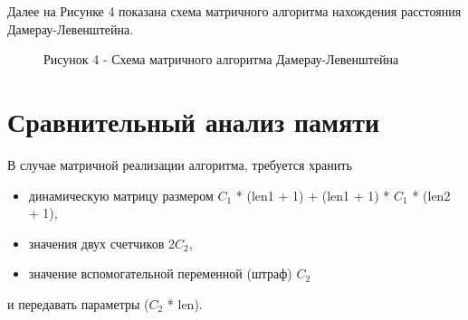 \documentclass[12pt]{report}
\begin{document}
\newpage
Далее на Рисунке 4 показана схема матричного алгоритма нахождения расстояния Дамерау-Левенштейна.
\begin{figure}[h!]
	\caption*{Рисунок 4 - Схема матричного алгоритма Дамерау-Левенштейна}
\end{figure}

\section{Сравнительный анализ памяти}
В случае матричной реализации алгоритма, требуется хранить
\begin{itemize}
	\item динамическую матрицу размером $C_1$ * (len1 + 1) + (len1 + 1) * $C_1$ * (len2 + 1),
	\item значения двух счетчиков 2$C_2$,
	\item значение вспомогательной переменной (штраф) $C_2$
\end{itemize}
и передавать параметры ($C_2$ * len).
\end{document}
